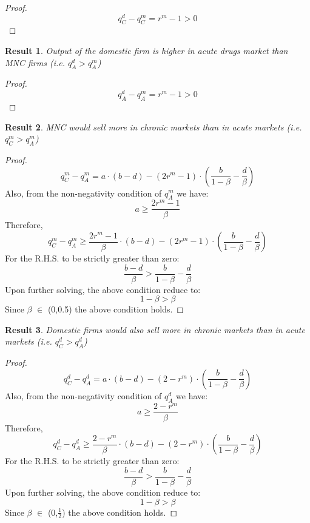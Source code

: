 \documentclass[AER]{AEA}
\theoremstyle{theorem}
\newtheorem{res}{Result}
\begin{document}
\begin{proof}
	\[q_{C}^{d} - q_{C}^{m}  =  r^{m} - 1 > 0  \]
\end{proof}
 
\begin{res}
	Output of the domestic firm  is higher in acute drugs market than MNC firms (i.e. $q_{A}^{d} > q_{A}^{m}$)
\end{res}

\begin{proof}
	\[q_{A}^{d} - q_{A}^{m}  =  r^{m} - 1 > 0  \]
\end{proof}



\begin{res}
	MNC would sell more in chronic markets than in acute markets (i.e. $q_{C}^{m} > q_{A}^{m}$)
\end{res}

\begin{proof}
	\[q_{C}^{m} - q_{A}^{m}  =  a\cdot(b-d) - \left(2r^{m} - 1 \right)\cdot\left(\frac{b}{1-\beta} - \frac{d}{\beta}\right)   \] 
	Also, from the non-negativity condition of $q_{A}^{m}$ we have: 
	 \[a \geq \frac{2r^{m}-1}{\beta} \]
	 Therefore,
	 \[q_{C}^{m} - q_{A}^{m} \geq  \frac{2r^{m}-1}{\beta}\cdot(b-d) -\left(2r^{m} - 1 \right)\cdot\left(\frac{b}{1-\beta} - \frac{d}{\beta}\right)  \]
	 For the R.H.S. to be strictly greater than zero:
	 \[ \frac{b-d}{\beta} > \frac{b}{1-\beta} - \frac{d}{\beta}  \]
	 Upon further solving, the above condition reduce to:
	 \[1-\beta > \beta  \]
	 Since $\beta$ $\in$ (0,0.5) the above condition holds.
\end{proof}

\begin{res}
	Domestic firms would also sell more in chronic markets than in acute markets (i.e. $q_{C}^{d} > q_{A}^{d}$)
\end{res}

\begin{proof}
	\[q_{C}^{d} - q_{A}^{d}  =  a\cdot(b-d) - \left( 2-r^{m}\right)\cdot\left(\frac{b}{1-\beta} - \frac{d}{\beta}\right)    \] 
	Also, from the non-negativity condition of $q_{A}^{d}$ we have: 
	\[a \geq \frac{2-r^{m}}{\beta} \]
	Therefore,
	\[q_{C}^{d} - q_{A}^{d} \geq \frac{2-r^{m}}{\beta}\cdot(b-d) -\left( 2-r^{m} \right)\cdot\left(\frac{b}{1-\beta} - \frac{d}{\beta}\right)  \]
	For the R.H.S. to be strictly greater than zero:
	\[ \frac{b-d}{\beta} > \frac{b}{1-\beta} - \frac{d}{\beta}  \]
	Upon further solving, the above condition reduce to:
	\[1-\beta > \beta  \]
	Since $\beta$ $\in$ (0,$\frac{1}{2}$) the above condition holds.
\end{proof}
\end{document}
